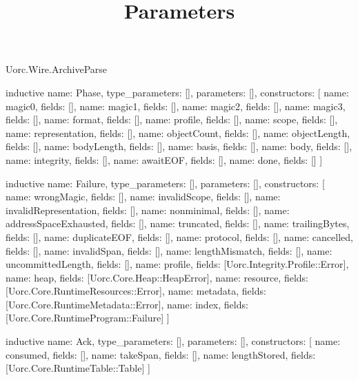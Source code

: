 \begin{lexlean}{Uorc.Wire.ArchiveParse}
\title{Parameters}
\begin{semanticmodule}
inductive{
  name: Phase,
  type_parameters: [],
  parameters: [],
  constructors: [
    {name: magic0, fields: []},
    {name: magic1, fields: []},
    {name: magic2, fields: []},
    {name: magic3, fields: []},
    {name: format, fields: []},
    {name: profile, fields: []},
    {name: scope, fields: []},
    {name: representation, fields: []},
    {name: objectCount, fields: []},
    {name: objectLength, fields: []},
    {name: bodyLength, fields: []},
    {name: basis, fields: []},
    {name: body, fields: []},
    {name: integrity, fields: []},
    {name: awaitEOF, fields: []},
    {name: done, fields: []}
  ]
}

inductive{
  name: Failure,
  type_parameters: [],
  parameters: [],
  constructors: [
    {name: wrongMagic, fields: []},
    {name: invalidScope, fields: []},
    {name: invalidRepresentation, fields: []},
    {name: nonminimal, fields: []},
    {name: addressSpaceExhausted, fields: []},
    {name: truncated, fields: []},
    {name: trailingBytes, fields: []},
    {name: duplicateEOF, fields: []},
    {name: protocol, fields: []},
    {name: cancelled, fields: []},
    {name: invalidSpan, fields: []},
    {name: lengthMismatch, fields: []},
    {name: uncommittedLength, fields: []},
    {name: profile, fields: [Uorc.Integrity.Profile::Error]},
    {name: heap, fields: [Uorc.Core.Heap::HeapError]},
    {name: resource, fields: [Uorc.Core.RuntimeResources::Error]},
    {name: metadata, fields: [Uorc.Core.RuntimeMetadata::Error]},
    {name: index, fields: [Uorc.Core.RuntimeProgram::Failure]}
  ]
}

inductive{
  name: Ack,
  type_parameters: [],
  parameters: [],
  constructors: [
    {name: consumed, fields: []},
    {name: takeSpan, fields: []},
    {name: lengthStored, fields: [Uorc.Core.RuntimeTable::Table]}
  ]
}


\end{semanticmodule}
\end{lexlean}
